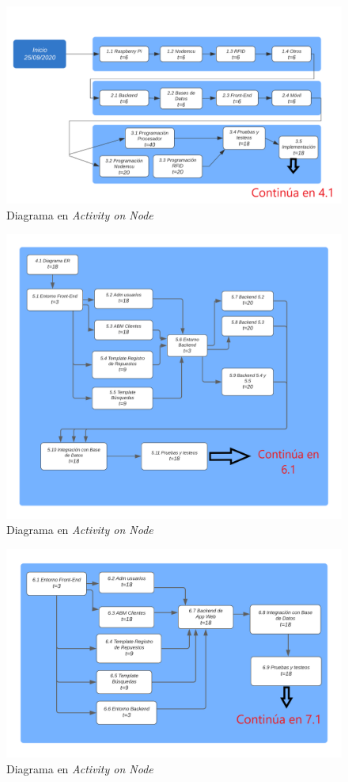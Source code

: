 \documentclass[11pt]{charter}
\begin{document}
\begin{figure}[htpb]
\centering 
\includegraphics[width=.9\textwidth]{./Figuras/AON-1.png}
\caption{Diagrama en \textit{Activity on Node}}
\label{fig:AoN}
\end{figure}
\begin{figure}[htpb]
\centering 
\includegraphics[width=.9\textwidth]{./Figuras/AON-2.png}
\caption{Diagrama en \textit{Activity on Node}}
\label{fig:AoN}
\end{figure}

\begin{figure}[htpb]
\centering 
\includegraphics[width=.9\textwidth]{./Figuras/AON-3.png}
\caption{Diagrama en \textit{Activity on Node}}
\label{fig:AoN}
\end{figure}
\end{document}
